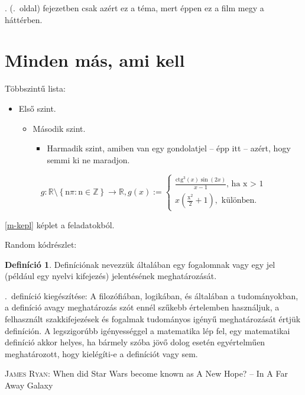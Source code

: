 \documentclass[a4paper,12pt,twoside]{report}
\theoremstyle{definition}
\newtheorem{definicio}{Definíció}[chapter]
\begin{document}
	. (\pageref{fej-filmek}.~oldal) fejezetben csak azért ez a téma, mert éppen ez a film megy a háttérben. 
	
	\section{Minden más, ami kell}
	Többszintű lista:
	\begin{itemize}
		\item Első szint.
		\begin{itemize}
			\item Második szint.
			\begin{itemize}
				\item Harmadik szint, amiben van egy gondolatjel -- épp itt -- azért, hogy semmi ki ne maradjon.
			\end{itemize}
		\end{itemize}
	\end{itemize}
	\begin{equation}\label{m-kepl}
		g: \mathbb{R}\setminus \left\{ \mathcal{\mathrm{n}\pi}:\mathcal{\mathrm{n}\in \mathbb{Z}} \right\}\longrightarrow \mathbb{R},  g(x) :=  \left\{ \begin{array}{cl}
	\frac{\mathrm{ctg}_{}^{3}(x)\sin(2x)}{x-1} \text{, ha x > 1}\\
			x(\frac{\mathrm{x}_{}^{2}}{2}+1), \text{ különben.}
		\end{array} \right.
	\end{equation} 

	\eqref{m-kepl} képlet a feladatokból.
	
	Random kódrészlet: 
	
	\begin{definicio}\label{def-definition}
		Definíciónak nevezzük általában egy fogalomnak vagy egy jel (például egy nyelvi kifejezés) jelentésének meghatározását.
	\end{definicio}
	\Az{\ref{def-definition}}.~definíció kiegészítése: A filozófiában, logikában, és általában a tudományokban, a definíció avagy meghatározás szót ennél szűkebb értelemben használjuk, a felhasznált szakkifejezések és fogalmak tudományos igényű meghatározását értjük definíción. A legszigorúbb igényességgel a matematika lép fel, egy matematikai definíció akkor helyes, ha bármely szóba jövő dolog esetén egyértelműen meghatározott, hogy kielégíti-e a definíciót vagy sem. 

	\begin{thebibliography}{1}
		 \textsc{James Ryan}: When did Star Wars become known as A New Hope? -- In A Far Away Galaxy
	\end{thebibliography}
\end{document}
